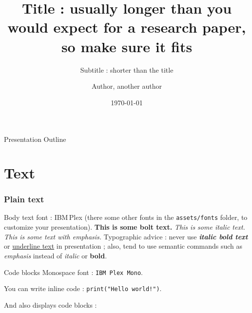\documentclass[
  11pt, %
  aspectratio=169, %
]{beamer}
\title{Title : usually longer than you would expect for a research paper, so make sure it fits}
\subtitle{Subtitle : shorter than the title}
\author{Author\inst{1}, another author\inst{2}}
\institute{\inst{1}ARAMIS Lab, \inst{2}Another institute}
\date{\today}
\begin{document}




\begin{frame}[plain, label=titlepage]
  \titlepage
\end{frame}


\begin{frame}{Presentation Outline}
  \tableofcontents[hideallsubsections]
\end{frame}



\section{Text}

\begin{frame}
  \frametitle{Plain text}

  Body text font : IBM Plex (there some other fonts in the \texttt{assets/fonts} folder, to customize your presentation).
  \vfill
  \lipsum[1][1-3]
  \vfill
  \textbf{This is some bolt text.}
  \vfill
  \textit{This is some italic text.}
  \vfill
  \emph{This is some text with emphasis.}
  \vfill
  \vfill
  Typographic advice : never use \textbf{\textit{italic bold text}} or \underline{underline text} in presentation ; also, tend to use semantic commands such as \emph{emphasis} instead of \textit{italic} or \textbf{bold}.

\end{frame}

\begin{frame}{Code blocks}
  Monospace font : \texttt{IBM Plex Mono}.

  \vfill
  You can write inline code : \texttt{print("Hello world!")}.

  \vfill
  And also displays code blocks :

\end{frame}
\end{document}
